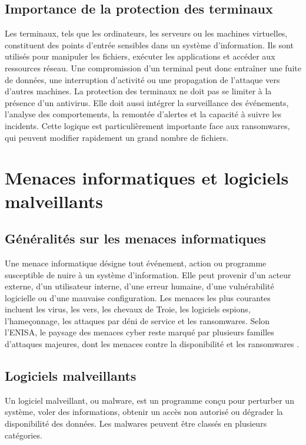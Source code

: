 \subsection{Importance de la protection des terminaux}

Les terminaux, tels que les ordinateurs, les serveurs ou les machines virtuelles, constituent des points d'entrée sensibles dans un système d'information. Ils sont utilisés pour manipuler les fichiers, exécuter les applications et accéder aux ressources réseau. Une compromission d'un terminal peut donc entraîner une fuite de données, une interruption d'activité ou une propagation de l'attaque vers d'autres machines. La protection des terminaux ne doit pas se limiter à la présence d'un antivirus. Elle doit aussi intégrer la surveillance des événements, l'analyse des comportements, la remontée d'alertes et la capacité à suivre les incidents. Cette logique est particulièrement importante face aux ransomwares, qui peuvent modifier rapidement un grand nombre de fichiers.

\section{Menaces informatiques et logiciels malveillants}

\subsection{Généralités sur les menaces informatiques}

Une menace informatique désigne tout événement, action ou programme susceptible de nuire à un système d'information. Elle peut provenir d'un acteur externe, d'un utilisateur interne, d'une erreur humaine, d'une vulnérabilité logicielle ou d'une mauvaise configuration. Les menaces les plus courantes incluent les virus, les vers, les chevaux de Troie, les logiciels espions, l'hameçonnage, les attaques par déni de service et les ransomwares. Selon l'ENISA, le paysage des menaces cyber reste marqué par plusieurs familles d'attaques majeures, dont les menaces contre la disponibilité et les ransomwares \cite{enisaThreatLandscape2024}.

\subsection{Logiciels malveillants}

Un logiciel malveillant, ou malware, est un programme conçu pour perturber un système, voler des informations, obtenir un accès non autorisé ou dégrader la disponibilité des données. Les malwares peuvent être classés en plusieurs catégories. \\


